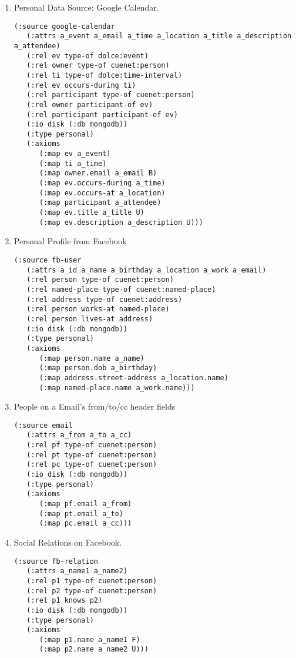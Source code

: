 \begin{enumerate}

\item Personal Data Source: Google Calendar.

\begin{verbatim}
(:source google-calendar
   (:attrs a_event a_email a_time a_location a_title a_description a_attendee)
   (:rel ev type-of dolce:event)
   (:rel owner type-of cuenet:person)
   (:rel ti type-of dolce:time-interval)
   (:rel ev occurs-during ti)
   (:rel participant type-of cuenet:person)
   (:rel owner participant-of ev)
   (:rel participant participant-of ev)
   (:io disk (:db mongodb))
   (:type personal)
   (:axioms
      (:map ev a_event)
      (:map ti a_time)
      (:map owner.email a_email B)
      (:map ev.occurs-during a_time)
      (:map ev.occurs-at a_location)
      (:map participant a_attendee)
      (:map ev.title a_title U)
      (:map ev.description a_description U)))
\end{verbatim}

\item Personal Profile from Facebook

\begin{verbatim}
(:source fb-user
   (:attrs a_id a_name a_birthday a_location a_work a_email)
   (:rel person type-of cuenet:person)
   (:rel named-place type-of cuenet:named-place)
   (:rel address type-of cuenet:address)
   (:rel person works-at named-place)
   (:rel person lives-at address)
   (:io disk (:db mongodb))
   (:type personal)
   (:axioms
      (:map person.name a_name)
      (:map person.dob a_birthday)
      (:map address.street-address a_location.name)
      (:map named-place.name a_work.name)))
\end{verbatim}

\item People on a Email's from/to/cc header fields

\begin{verbatim}
(:source email
   (:attrs a_from a_to a_cc)
   (:rel pf type-of cuenet:person)
   (:rel pt type-of cuenet:person)
   (:rel pc type-of cuenet:person)
   (:io disk (:db mongodb))
   (:type personal)
   (:axioms
      (:map pf.email a_from)
      (:map pt.email a_to)
      (:map pc.email a_cc)))
\end{verbatim}

\item Social Relations on Facebook.

\begin{verbatim}
(:source fb-relation
   (:attrs a_name1 a_name2)
   (:rel p1 type-of cuenet:person)
   (:rel p2 type-of cuenet:person)
   (:rel p1 knows p2)
   (:io disk (:db mongodb))
   (:type personal)
   (:axioms
      (:map p1.name a_name1 F)
      (:map p2.name a_name2 U)))
\end{verbatim}


\end{enumerate}
